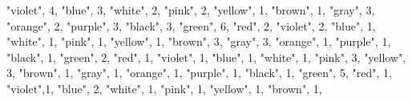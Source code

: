 \documentclass[
]{article}
\newenvironment{Shaded}{\begin{snugshade}}{\end{snugshade}}
\newcommand{\DecValTok}[1]{\textcolor[rgb]{0.00,0.00,0.81}{#1}}
\newcommand{\NormalTok}[1]{#1}
\newcommand{\StringTok}[1]{\textcolor[rgb]{0.31,0.60,0.02}{#1}}
\begin{document}
\begin{Shaded}
\begin{Highlighting}[]
  \StringTok{"violet"}\NormalTok{, }\DecValTok{4}\NormalTok{,}
  \StringTok{"blue"}\NormalTok{, }\DecValTok{3}\NormalTok{,}
  \StringTok{"white"}\NormalTok{, }\DecValTok{2}\NormalTok{,}
  \StringTok{"pink"}\NormalTok{, }\DecValTok{2}\NormalTok{,}
  \StringTok{"yellow"}\NormalTok{, }\DecValTok{1}\NormalTok{,}
  \StringTok{"brown"}\NormalTok{, }\DecValTok{1}\NormalTok{,}
  \StringTok{"gray"}\NormalTok{, }\DecValTok{3}\NormalTok{,}
  \StringTok{"orange"}\NormalTok{, }\DecValTok{2}\NormalTok{,}
  \StringTok{"purple"}\NormalTok{, }\DecValTok{3}\NormalTok{,}
    \StringTok{"black"}\NormalTok{, }\DecValTok{3}\NormalTok{,}
  \StringTok{"green"}\NormalTok{, }\DecValTok{6}\NormalTok{,}
  \StringTok{"red"}\NormalTok{, }\DecValTok{2}\NormalTok{,}
  \StringTok{"violet"}\NormalTok{, }\DecValTok{2}\NormalTok{,}
  \StringTok{"blue"}\NormalTok{, }\DecValTok{1}\NormalTok{, }
  \StringTok{"white"}\NormalTok{, }\DecValTok{1}\NormalTok{,}
  \StringTok{"pink"}\NormalTok{, }\DecValTok{1}\NormalTok{,}
  \StringTok{"yellow"}\NormalTok{, }\DecValTok{1}\NormalTok{,}
  \StringTok{"brown"}\NormalTok{, }\DecValTok{3}\NormalTok{,}
  \StringTok{"gray"}\NormalTok{, }\DecValTok{3}\NormalTok{,}
  \StringTok{"orange"}\NormalTok{, }\DecValTok{1}\NormalTok{,}
  \StringTok{"purple"}\NormalTok{, }\DecValTok{1}\NormalTok{,}
    \StringTok{"black"}\NormalTok{, }\DecValTok{1}\NormalTok{,}
  \StringTok{"green"}\NormalTok{, }\DecValTok{2}\NormalTok{,}
  \StringTok{"red"}\NormalTok{, }\DecValTok{1}\NormalTok{,}
  \StringTok{"violet"}\NormalTok{, }\DecValTok{1}\NormalTok{,}
  \StringTok{"blue"}\NormalTok{, }\DecValTok{1}\NormalTok{,}
  \StringTok{"white"}\NormalTok{, }\DecValTok{1}\NormalTok{,}
  \StringTok{"pink"}\NormalTok{, }\DecValTok{3}\NormalTok{,}
  \StringTok{"yellow"}\NormalTok{, }\DecValTok{3}\NormalTok{,}
  \StringTok{"brown"}\NormalTok{, }\DecValTok{1}\NormalTok{,}
  \StringTok{"gray"}\NormalTok{, }\DecValTok{1}\NormalTok{,}
  \StringTok{"orange"}\NormalTok{, }\DecValTok{1}\NormalTok{,}
  \StringTok{"purple"}\NormalTok{, }\DecValTok{1}\NormalTok{,}
    \StringTok{"black"}\NormalTok{, }\DecValTok{1}\NormalTok{,}
  \StringTok{"green"}\NormalTok{, }\DecValTok{5}\NormalTok{,}
  \StringTok{"red"}\NormalTok{, }\DecValTok{1}\NormalTok{,}
  \StringTok{"violet"}\NormalTok{,}\DecValTok{1}\NormalTok{,}
  \StringTok{"blue"}\NormalTok{, }\DecValTok{2}\NormalTok{,}
  \StringTok{"white"}\NormalTok{, }\DecValTok{1}\NormalTok{,}
  \StringTok{"pink"}\NormalTok{, }\DecValTok{1}\NormalTok{,}
  \StringTok{"yellow"}\NormalTok{, }\DecValTok{1}\NormalTok{,}
  \StringTok{"brown"}\NormalTok{, }\DecValTok{1}\NormalTok{,}

\end{Highlighting}
\end{Shaded}
\end{document}
